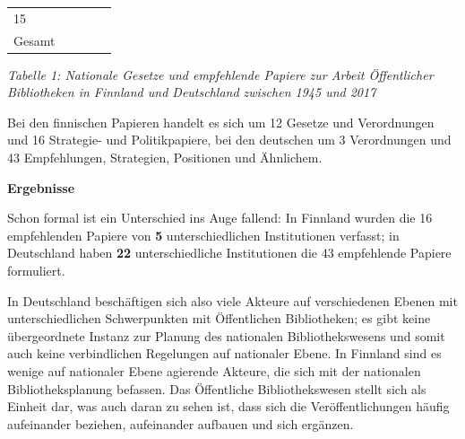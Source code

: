 \documentclass[a4paper,
fontsize=11pt,
oneside,
numbers=noperiodatend,
parskip=half-,
bibliography=totoc,
final
]{scrartcl}
\begin{document}
\begin{longtable}[]{@{}lclcl@{}}
\begin{minipage}[t]{0.22\columnwidth}
15\strut
\end{minipage} & \begin{minipage}[t]{0.14\columnwidth}\centering
7\strut
\end{minipage}\tabularnewline
\begin{minipage}[t]{0.12\columnwidth}\centering
Gesamt\strut
\end{minipage} & \begin{minipage}[t]{0.23\columnwidth}\centering
12\strut
\end{minipage} & \begin{minipage}[t]{0.14\columnwidth}\centering
3\strut
\end{minipage} & \begin{minipage}[t]{0.22\columnwidth}\centering
16\strut
\end{minipage} & \begin{minipage}[t]{0.14\columnwidth}\centering
43\strut
\end{minipage}\tabularnewline
\bottomrule
\end{longtable}

\emph{Tabelle 1: Nationale Gesetze und empfehlende Papiere zur Arbeit
Öffentlicher Bibliotheken in Finnland und Deutschland zwischen 1945 und
2017}

Bei den finnischen Papieren handelt es sich um 12 Gesetze und
Verordnungen und 16 Strategie- und Politikpapiere, bei den deutschen um
3 Verordnungen und 43 Empfehlungen, Strategien, Positionen und
Ähnlichem.

\textbf{Ergebnisse}

Schon formal ist ein Unterschied ins Auge fallend: In Finnland wurden
die 16 empfehlenden Papiere von \textbf{5} unterschiedlichen
Institutionen verfasst; in Deutschland haben \textbf{22}
unterschiedliche Institutionen die 43 empfehlende Papiere formuliert.

In Deutschland beschäftigen sich also viele Akteure auf verschiedenen
Ebenen mit unterschiedlichen Schwerpunkten mit Öffentlichen
Bibliotheken; es gibt keine übergeordnete Instanz zur Planung des
nationalen Bibliothekswesens und somit auch keine verbindlichen
Regelungen auf nationaler Ebene. In Finnland sind es wenige auf
nationaler Ebene agierende Akteure, die sich mit der nationalen
Bibliotheksplanung befassen. Das Öffentliche Bibliothekswesen stellt
sich als Einheit dar, was auch daran zu sehen ist, dass sich die
Veröffentlichungen häufig aufeinander beziehen, aufeinander aufbauen und
sich ergänzen.
\end{document}
